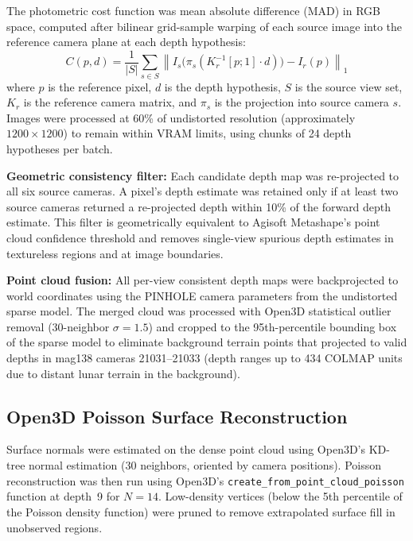 \documentclass[12pt]{article}
\begin{document}
The photometric cost function was mean absolute difference (MAD) in RGB space, computed after bilinear grid-sample warping of each source image into the reference camera plane at each depth hypothesis:
\begin{equation}
    C(p, d) = \frac{1}{|S|} \sum_{s \in S} \left\| I_s\bigl(\pi_s(K_r^{-1} [p; 1] \cdot d)\bigr) - I_r(p) \right\|_1
\end{equation}
where $p$ is the reference pixel, $d$ is the depth hypothesis, $S$ is the source view set, $K_r$ is the reference camera matrix, and $\pi_s$ is the projection into source camera $s$. Images were processed at 60\% of undistorted resolution (approximately $1200 \times 1200$) to remain within VRAM limits, using chunks of 24 depth hypotheses per batch.

\textbf{Geometric consistency filter:} Each candidate depth map was re-projected to all six source cameras. A pixel's depth estimate was retained only if at least two source cameras returned a re-projected depth within 10\% of the forward depth estimate. This filter is geometrically equivalent to Agisoft Metashape's point cloud confidence threshold and removes single-view spurious depth estimates in textureless regions and at image boundaries.

\textbf{Point cloud fusion:} All per-view consistent depth maps were backprojected to world coordinates using the PINHOLE camera parameters from the undistorted sparse model. The merged cloud was processed with Open3D statistical outlier removal (30-neighbor $\sigma{=}1.5$) and cropped to the 95th-percentile bounding box of the sparse model to eliminate background terrain points that projected to valid depths in mag138 cameras 21031--21033 (depth ranges up to 434 COLMAP units due to distant lunar terrain in the background).

\subsection{Open3D Poisson Surface Reconstruction}

Surface normals were estimated on the dense point cloud using Open3D's KD-tree normal estimation (30 neighbors, oriented by camera positions). Poisson reconstruction was then run using Open3D's \texttt{create\_from\_point\_cloud\_poisson} function at depth~9 for $N{=}14$. Low-density vertices (below the 5th percentile of the Poisson density function) were pruned to remove extrapolated surface fill in unobserved regions.
\end{document}
